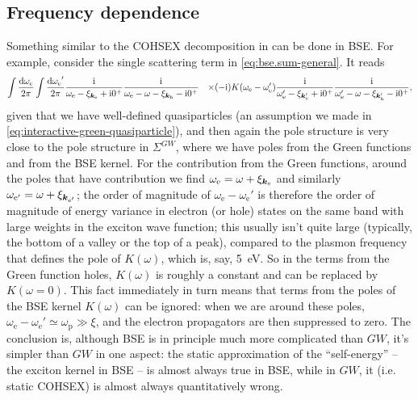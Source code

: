 \documentclass[hyperref, a4paper, 12pt]{report}
\newcommand*{\ii}{\mathrm{i}}
\def\\{}%
\begin{document}
\subsection{Frequency dependence}

Something similar to the COHSEX decomposition in 
can be done in BSE. 
For example, consider the single scattering term in \eqref{eq:bse.sum-general}.
It reads
\begin{equation}
    \begin{aligned}
        \int \frac{\dd{\omega_\text{e}}}{2\pi} \int \frac{\dd{\omega_\text{e}}'}{2\pi} 
        &\frac{\ii}{\omega_{\text{e}} - \xi_{\vb*{k}_{\text{e}}} + \ii 0^+}
        \frac{\ii}{\omega_{\text{e}} - \omega - \xi_{\vb*{k}_{\text{h}}} - \ii 0^+} \\
        &\times (-\ii ) K(\omega_{\text{e}} - \omega_{\text{e}}') 
        \frac{\ii}{\omega_{\text{e}}' - \xi_{\vb*{k}_{\text{e}}'} + \ii 0^+}
        \frac{\ii}{\omega_{\text{e}}' - \omega - \xi_{\vb*{k}_{\text{h}}'} - \ii 0^+},
    \end{aligned}
\end{equation}
given that we have well-defined quasiparticles
(an assumption we made in \eqref{eq:interactive-green-quasiparticle}), 
and then again the pole structure is very close to the pole structure in $\Sigma^{GW}$,
where we have poles from the Green functions and from the BSE kernel.
For the contribution from the Green functions,
around the poles that have contribution we find 
$\omega_{\text{e}} = \omega + \xi_{\vb*{k}_{\text{e}}}$ 
and similarly $\omega_{\text{e}'} = \omega + \xi_{\vb*{k}_{\text{e}'}}$;
the order of magnitude of $\omega_{\text{e}} - \omega_{\text{e}}'$
is therefore the order of magnitude of energy variance in 
electron (or hole) states on the same band with large weights in the exciton wave function;
this usually isn't quite large (typically, the bottom of a valley or the top of a peak),
compared to the plasmon frequency that defines the pole of $K(\omega)$, 
which is, say, \SI{5}{eV}.
So in the terms from the Green function holes, 
$K(\omega)$ is roughly a constant and can be replaced by $K(\omega = 0)$.
This fact immediately in turn means that
terms from the poles of the BSE kernel $K(\omega)$ can be ignored:
when we are around these poles, 
$\omega_{\text{e}} - \omega_{\text{e}}' \simeq \omega_{\text{p}} \gg \xi$,
and the electron propagators are then suppressed to zero.
The conclusion is, although BSE is in principle much more complicated than $GW$,
it's simpler than $GW$ in one aspect:
the static approximation of the ``self-energy'' -- the exciton kernel in BSE -- 
is almost always true in BSE, 
while in $GW$, it (i.e. static COHSEX) is almost always quantitatively wrong.
\end{document}
